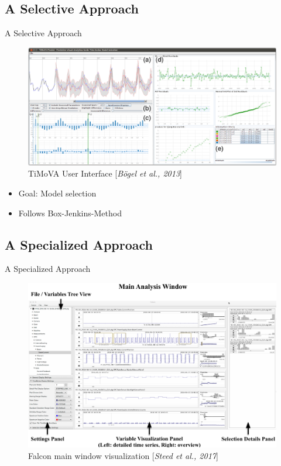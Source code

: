 \documentclass[10pt]{beamer}
\begin{document}
\subsection{A Selective Approach}
\begin{frame}{A Selective Approach}
	\centering
	\begin{figure}[htbp]
		\includegraphics[scale=.17]{images/TiMoVA}
		\caption{TiMoVA User Interface [\textit{B\"ogel et al., 2013}]}
	\end{figure}
	\begin{itemize}
		\item Goal: Model selection
		\item Follows Box-Jenkins-Method
	\end{itemize}
\end{frame}


\subsection{A Specialized Approach}
\begin{frame}{A Specialized Approach}
	\centering
	\begin{figure}[htbp]
		\includegraphics[scale=.2]{images/Falcon_main}
		\caption{Falcon main window visualization [\textit{Steed et al., 2017}]}
	\end{figure}
\end{frame}
\end{document}
